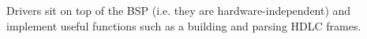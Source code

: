 Drivers sit on top of the B\+SP (i.\+e. they are hardware-\/independent) and implement useful functions such as a building and parsing H\+D\+LC frames. 